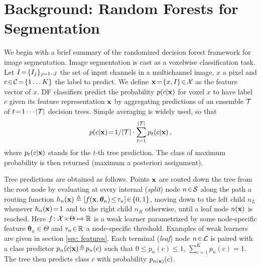 
\section{Background: Random Forests for Segmentation}
\label{sec: background}

We begin with a brief summary of the randomized decision forest framework for image segmentation. Image segmentation is cast as a voxelwise classification task. Let $I\!=\!\{I_j\}_{j=1\!\cdots\! J}$ the set of input channels in a multichannel image, $x$ a pixel and $c\!\in\!\mathcal{C}\!=\!\{1 \dots K\}$ the label to predict. We define $\boldsymbol{\mathrm{x}}\!=\!\{x,I\}\!\in\!\mathcal{X}$ as the feature vector of $x$. DF classifiers predict the probability $p(c\vert\boldsymbol{\mathrm{x}})$ for voxel $x$ to have label $c$ given its feature representation $\boldsymbol{\mathrm{x}}$ by aggregating predictions of an ensemble $\mathcal{T}$ of $t\!=\!1\cdots \vert\mathcal{T}\vert$ decision trees. Simple averaging is widely used, so that 
$$p(c\vert\boldsymbol{\mathrm{x}})\!=\!1/\vert\mathcal{T}\vert\cdot\sum_{t=1}^{\vert\mathcal{T}\vert}p_t(c\vert\boldsymbol{\mathrm{x}})\, ,$$
where $p_t(c\vert\boldsymbol{\mathrm{x}})$ stands for the $t$-th tree prediction. The class of maximum probability is then returned (maximum a posteriori assignment). 

Tree predictions are obtained as follows. Points $\boldsymbol{\mathrm{x}}$ are routed down the tree from the root node by evaluating at every internal (\textit{split}) node $n\!\in\!\mathcal{S}$ along the path a routing function $h_n(\boldsymbol{\mathrm{x}})\triangleq[f(\boldsymbol{\mathrm{x}},\bm{\theta}_n)\!\leq\!\tau_n]\!\in\!\{0,1\}$, moving down to the left child $n_L$ whenever $h_n(\boldsymbol{\mathrm{x}})\!=\!1$ and to the right child $n_R$ otherwise, until a leaf node $n(\boldsymbol{\mathrm{x}})$ is reached. Here $f\!:\mathcal{X}\!\times\!\Theta\mapsto\mathbb{R}$ is a weak learner parametrized by some node-specific feature $\bm{\theta}_n\!\in\!\Theta$ and $\tau_n\!\in\!\mathbb{R}$ a node-specific threshold. Examples of weak learners are given in section \ref{sec: features}. Each terminal (\textit{leaf}) node $n\!\in\!\mathcal{L}$ is paired with a class predictor $p_n(c\vert \boldsymbol{\mathrm{x}})\!\triangleq\!p_n(c)$ such that $0\!\leq\!p_n(c)\!\leq\!1$, $\sum_{c=1}^Kp_n(c)\!=\!1$. The tree then predicts class $c$ with probability $p_{n(\boldsymbol{\mathrm{x}})}(c)$. 


